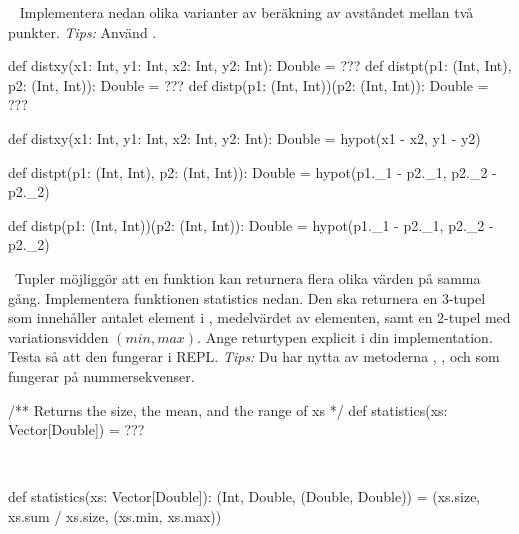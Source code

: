 \QUESTEND



\QUESTBEGIN

\Task  \what~ Implementera nedan olika varianter av beräkning av avståndet mellan två punkter. \emph{Tips:} Använd .
\begin{Code}
def distxy(x1: Int, y1: Int, x2: Int, y2: Int): Double = ???
def distpt(p1: (Int, Int), p2: (Int, Int)):     Double = ???
def distp(p1: (Int, Int))(p2: (Int, Int)):      Double = ???

\end{Code}

\SOLUTION

\TaskSolved \what

\begin{Code}
def distxy(x1: Int, y1: Int, x2: Int, y2: Int): Double =
  hypot(x1 - x2, y1 - y2)

def distpt(p1: (Int, Int), p2: (Int, Int)): Double =
  hypot(p1._1 - p2._1, p2._2 - p2._2)

def distp(p1: (Int, Int))(p2: (Int, Int)): Double =
  hypot(p1._1 - p2._1, p2._2 - p2._2)
\end{Code}

\QUESTEND



\QUESTBEGIN

\Task \what~Tupler möjliggör att en funktion kan returnera flera olika värden på samma gång. Implementera funktionen statistics nedan. Den ska returnera en 3-tupel som innehåller antalet element i , medelvärdet av elementen, samt en 2-tupel med variationsvidden $(min, max)$. Ange returtypen explicit i din implementation. Testa så att den fungerar i REPL. \emph{Tips:} Du har nytta av metoderna , ,  och  som fungerar på nummersekvenser.

\begin{Code}
/** Returns the size, the mean, and the range of xs */
def statistics(xs: Vector[Double]) = ???
\end{Code}

\SOLUTION

\TaskSolved \what~

\begin{Code}
def statistics(xs: Vector[Double]): (Int, Double, (Double, Double)) =
  (xs.size, xs.sum / xs.size, (xs.min, xs.max))
\end{Code}

